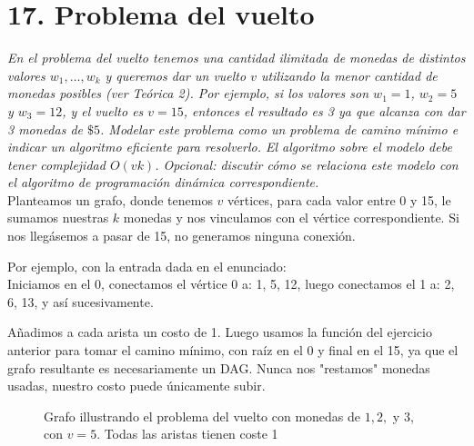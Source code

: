 \documentclass{article}
\begin{document}
\section*{17. Problema del vuelto}

\textit{En el problema del vuelto tenemos una cantidad ilimitada de monedas de distintos valores \( w_1, \ldots, w_k \) y queremos dar un vuelto \( v \) utilizando la menor cantidad de monedas posibles (ver Teórica 2). Por ejemplo, si los valores son \( w_1 = 1 \), \( w_2 = 5 \) y \( w_3 = 12 \), y el vuelto es \( v = 15 \), entonces el resultado es 3 ya que alcanza con dar 3 monedas de \( \$5 \). Modelar este problema como un problema de camino mínimo e indicar un algoritmo eficiente para resolverlo. El algoritmo sobre el modelo debe tener complejidad \( O(vk) \). Opcional: discutir cómo se relaciona este modelo con el algoritmo de programación dinámica correspondiente.}\\

Planteamos un grafo, donde tenemos \( v \) vértices, para cada valor entre 0 y 15, le sumamos nuestras \( k \) monedas y nos vinculamos con el vértice correspondiente. Si nos llegásemos a pasar de 15, no generamos ninguna conexión.

Por ejemplo, con la entrada dada en el enunciado:\\

Iniciamos en el 0, conectamos el vértice 0 a: 1, 5, 12, luego conectamos el 1 a: 2, 6, 13, y así sucesivamente.

Añadimos a cada arista un costo de 1. Luego usamos la función del ejercicio anterior para tomar el camino mínimo, con raíz en el 0 y final en el 15, ya que el grafo resultante es necesariamente un DAG. Nunca nos "restamos" monedas usadas, nuestro costo puede únicamente subir.

\begin{figure}[h]
\centering
{}
\caption{Grafo illustrando el problema del vuelto con monedas de \( 1, 2, \) y \( 3 \), con \( v = 5 \). Todas las aristas tienen coste 1}
\label{fig:coin_change_graph}
\end{figure}
\end{document}
